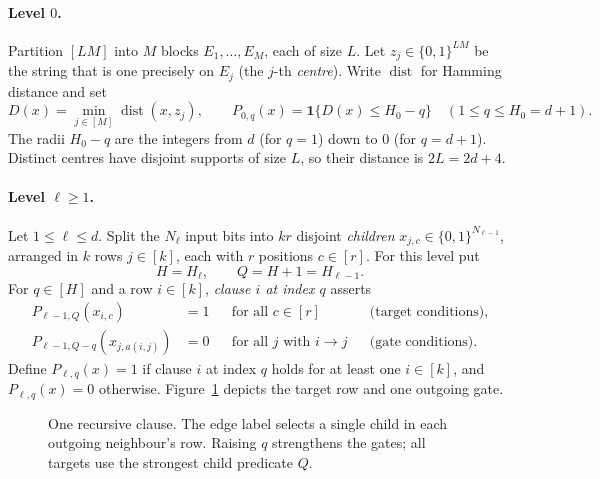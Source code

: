 \documentclass[11pt]{article}
\theoremstyle{definition}
\theoremstyle{remark}
\begin{document}
\paragraph{Level \(0\).}
Partition \([LM]\) into \(M\) blocks \(E_1,\ldots,E_M\), each of
size \(L\). Let \(z_j\in\{0,1\}^{LM}\) be the string that is one precisely on \(E_j\) (the \(j\)-th \emph{centre}).
Write \(\operatorname{dist}\) for Hamming distance and set
\[
 D(x)=\min_{j\in[M]}\operatorname{dist}(x,z_j),\qquad
 P_{0,q}(x)=\mathbf1\{D(x)\le H_0-q\}\quad(1\le q\le H_0=d+1).
\]
The radii \(H_0-q\) are the integers from \(d\) (for \(q=1\)) down to \(0\) (for \(q=d+1\)).
Distinct centres have disjoint supports of size \(L\), so their distance is \(2L=2d+4\).

\paragraph{Level \(\ell\ge1\).}
Let \(1\le\ell\le d\). Split the \(N_\ell\) input bits into \(kr\) disjoint
\emph{children} \(x_{j,c}\in\{0,1\}^{N_{\ell-1}}\), arranged in \(k\) rows
\(j\in[k]\), each with \(r\) positions \(c\in[r]\).
For this level put
\[
 H=H_\ell,\qquad Q=H+1=H_{\ell-1}.
\]
For \(q\in[H]\) and a row \(i\in[k]\), \emph{clause \(i\) at index \(q\)} asserts
\begin{equation}\label{eq:predicate-definition}
 \begin{aligned}
 P_{\ell-1,Q}(x_{i,c})&=1 &&\text{for all }c\in[r] &&\text{(target conditions)},\\
 P_{\ell-1,Q-q}(x_{j,a(i,j)})&=0 &&\text{for all }j\text{ with }i\to j &&\text{(gate conditions)}.
 \end{aligned}
\end{equation}
Define \(P_{\ell,q}(x)=1\) if clause \(i\) at index \(q\) holds for at least one \(i\in[k]\), and \(P_{\ell,q}(x)=0\) otherwise.
Figure~\ref{fig:clause} depicts the target row and one outgoing gate.

\begin{figure}[htbp]
\centering
{}
\caption{One recursive clause. The edge label selects a single child in
each outgoing neighbour's row. Raising \(q\) strengthens the gates;
all targets use the strongest child predicate \(Q\).}
\label{fig:clause}
\end{figure}
\end{document}
